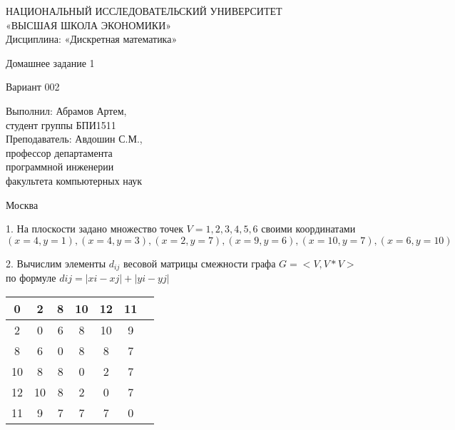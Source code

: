 \documentclass[a4paper,10pt]{report} %
\begin{document}
\begin{titlepage}
\newpage

\begin{center}
{\large НАЦИОНАЛЬНЫЙ ИССЛЕДОВАТЕЛЬСКИЙ УНИВЕРСИТЕТ \\
«ВЫСШАЯ ШКОЛА ЭКОНОМИКИ» 							\\
Дисциплина: «Дискретная математика»}

\vfill %

{\large Домашнее задание 1}

\bigskip

Вариант 002\\

\vfill

\begin{flushright}
Выполнил: Абрамов Артем,\\
студент группы БПИ1511\medskip \\
Преподаватель: Авдошин С.М., \\
профессор департамента \\
программной инженерии \\
факультета компьютерных наук
\end{flushright}

\vfill

Москва \number\year

\end{center}
\end{titlepage}




1. \quad На плоскости задано множество точек $V = {1, 2, 3, 4, 5, 6}$ своими координатами
$(x = 4,y = 1),(x = 4,y = 3),(x = 2,y = 7),(x = 9,y = 6),(x = 10,y = 7),(x = 6,y = 10)$ \\

\smallskip

2. \quad Вычислим элементы $d_{ij}$ весовой матрицы смежности графа 
$G = <V, V*V>$ по формуле $dij = |xi - xj|  +  |yi - yj|$

\begin{flushleft}\begin{tabular}[]{|c|c|c|c|c|c|c|}
\hline
     0  &      2 &      8 &      10 &     12 &      11\\
\hline
      2 &       0 &      6 &      8 &      10 &      9\\
\hline
      8 &      6 &     0  &      8 &      8  &      7\\
\hline
      10 &      8 &      8 &     0  &      2 &      7\\
\hline
      12 &      10 &     8 &     2 &    0 &      7\\
\hline
      11 &      9 &      7 &      7 &      7 &    0\\
\hline
\end{tabular}
\end{flushleft}
\end{document}
